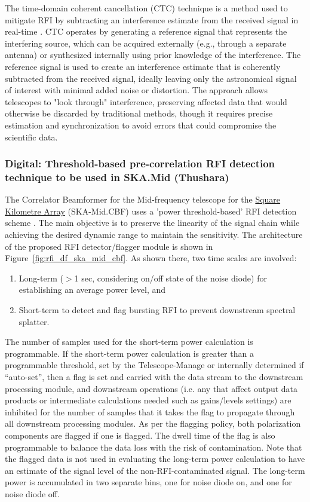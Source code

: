 The time-domain coherent cancellation (CTC) technique is a method used to mitigate RFI by subtracting an interference estimate from the received signal in real-time \cite{ellingson2022coherent}. CTC operates by generating a reference signal that represents the interfering source, which can be acquired externally (e.g., through a separate antenna) or synthesized internally using prior knowledge of the interference. The reference signal is used to create an interference estimate that is coherently subtracted from the received signal, ideally leaving only the astronomical signal of interest with minimal added noise or distortion. The approach allows telescopes to "look through" interference, preserving affected data that would otherwise be discarded by traditional methods, though it requires precise estimation and synchronization to avoid errors that could compromise the scientific data.

\subsubsection{Digital: Threshold-based pre-correlation RFI detection technique to be used in SKA.Mid (Thushara)}
\label{subsection:hardware:catalog:ska-mid}

The Correlator Beamformer for the Mid-frequency telescope for the \href{https://www.skao.int/en}{Square Kilometre Array} (SKA-Mid.CBF) uses a 'power threshold-based' RFI detection scheme \cite{ska_mid_cbf_rfi_2019}. The main objective is to preserve the linearity of the signal chain while achieving the desired dynamic range to maintain the sensitivity. The architecture of the proposed RFI detector/flagger module is shown in Figure~\ref{fig:rfi_df_ska_mid_cbf}. As shown there, two time scales are involved:
\begin{enumerate}
    \item Long-term ($>$1 sec, considering on/off state of the noise diode) for establishing an average power level, and
    \item Short-term to detect and flag bursting RFI to prevent downstream spectral splatter.
\end{enumerate}

The number of samples used for the short-term power calculation is programmable. If the short-term power calculation is greater than a programmable threshold, set by the Telescope-Manage or internally determined if “auto-set”, then a flag is set and carried with the data stream to the downstream processing module, and downstream operations (i.e. any that affect output data products or intermediate calculations needed such as gains/levels settings) are inhibited for the number of samples that it takes the flag to propagate through all downstream processing modules. As per the flagging policy, both polarization components are flagged if one is flagged. The dwell time of the flag is also programmable to balance the data loss with the risk of contamination. Note that the flagged data is not used in evaluating the long-term power calculation to have an estimate of the signal level of the non-RFI-contaminated signal. The long-term power is accumulated in two separate bins, one for noise diode on, and one for noise diode off.


